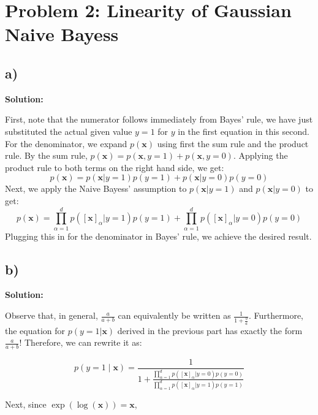 \documentclass[11pt]{article}
\begin{document}
\section*{Problem 2: Linearity of Gaussian Naive Bayess}

\subsection*{a)} 




\textbf{Solution: } 


First, note that the numerator follows immediately from Bayes' rule, we have just substituted the actual given value $y=1$ for $y$ in the first equation in this second. For the denominator, we expand $p(\mathbf{x})$ using first the sum rule and the product rule. By the sum rule, $p(\mathbf{x})=p(\mathbf{x},y=1)+p(\mathbf{x},y=0)$. Applying the product rule to both terms on the right hand side, we get:
\begin{equation*}
	p(\mathbf{x}) = p(\mathbf{x}|y=1)p(y=1)+p(\mathbf{x}|y=0)p(y=0)
\end{equation*}
Next, we apply the Naive Bayess' assumption to $p(\mathbf{x}|y=1)$ and $p(\mathbf{x}|y=0)$ to get:
\begin{equation*}
	p(\mathbf{x}) = \prod_{\alpha=1}^{d} p([\mathbf{x}]_{\alpha}|y=1)p(y=1)+\prod_{\alpha=1}^{d} p([\mathbf{x}]_{\alpha}|y=0)p(y=0)
\end{equation*}
Plugging this in for the denominator in Bayes' rule, we achieve the desired result.


\subsection*{b)}


\textbf{Solution:}



Observe that, in general, $\frac{a}{a+b}$ can equivalently be written as $\frac{1}{1+\frac{b}{a}}$. Furthermore, the equation for $p(y=1|\mathbf{x})$ derived in the previous part has exactly the form $\frac{a}{a+b}$! Therefore, we can rewrite it as:

\begin{equation*}
	p(y=1 \mid \mathbf{x})=\frac{1}{1+\frac{\prod_{\alpha=1}^{d} p([\mathbf{x}]_{\alpha}|y=0)p(y=0)}{\prod_{\alpha=1}^{d} p([\mathbf{x}]_{\alpha}|y=1)p(y=1)}}
\end{equation*}

Next, since $\exp(\log(\mathbf{x}))=\mathbf{x}$,
\end{document}
